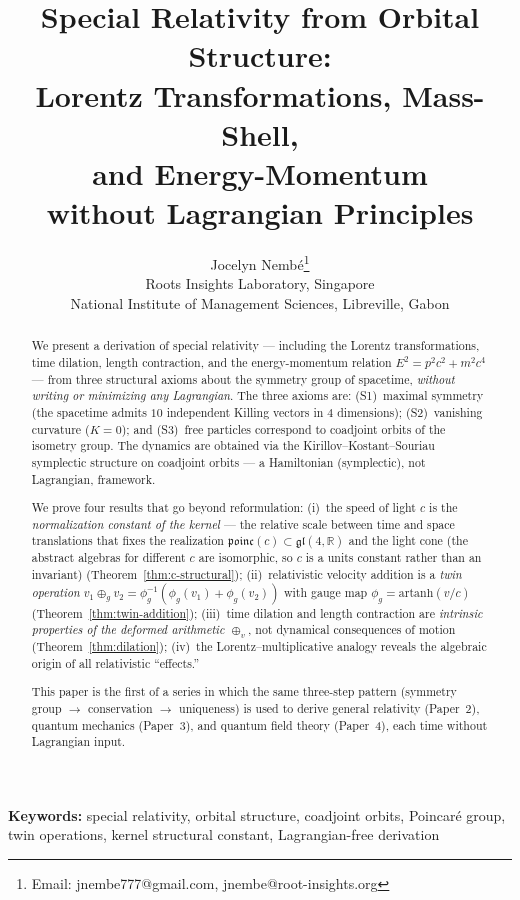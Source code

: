 \documentclass[12pt]{article}
\title{\textbf{Special Relativity from Orbital Structure:\\Lorentz Transformations, Mass-Shell,\\and Energy-Momentum\\without Lagrangian Principles}}
\author{Jocelyn Nemb\'e\thanks{Email: jnembe777@gmail.com, jnembe@root-insights.org}\\[0.3em]
\small Roots Insights Laboratory, Singapore\\
\small National Institute of Management Sciences, Libreville, Gabon}
\date{}
\theoremstyle{plain}
\theoremstyle{definition}
\theoremstyle{remark}
\newcommand{\R}{\mathbb{R}}
\begin{document}
\maketitle

\begin{abstract}
We present a derivation of special relativity --- including the Lorentz transformations, time dilation, length contraction, and the energy-momentum relation $E^2 = p^2c^2 + m^2c^4$ --- from three structural axioms about the symmetry group of spacetime, \emph{without writing or minimizing any Lagrangian}. The three axioms are: (S1)~maximal symmetry (the spacetime admits $10$ independent Killing vectors in $4$ dimensions); (S2)~vanishing curvature ($K=0$); and (S3)~free particles correspond to coadjoint orbits of the isometry group. The dynamics are obtained via the Kirillov--Kostant--Souriau symplectic structure on coadjoint orbits --- a Hamiltonian (symplectic), not Lagrangian, framework.

We prove four results that go beyond reformulation: (i)~the speed of light $c$ is the \emph{normalization constant of the kernel} --- the relative scale between time and space translations that fixes the realization $\mathfrak{poinc}(c) \subset \mathfrak{gl}(4,\R)$ and the light cone (the abstract algebras for different $c$ are isomorphic, so $c$ is a units constant rather than an invariant) (Theorem~\ref{thm:c-structural}); (ii)~relativistic velocity addition is a \emph{twin operation} $v_1 \oplus_g v_2 = \phi_g^{-1}(\phi_g(v_1) + \phi_g(v_2))$ with gauge map $\phi_g = \mathrm{artanh}(v/c)$ (Theorem~\ref{thm:twin-addition}); (iii)~time dilation and length contraction are \emph{intrinsic properties of the deformed arithmetic $\oplus_v$}, not dynamical consequences of motion (Theorem~\ref{thm:dilation}); (iv)~the Lorentz--multiplicative analogy reveals the algebraic origin of all relativistic ``effects.''

This paper is the first of a series in which the same three-step pattern (symmetry group $\to$ conservation $\to$ uniqueness) is used to derive general relativity (Paper~2), quantum mechanics (Paper~3), and quantum field theory (Paper~4), each time without Lagrangian input.
\end{abstract}

\noindent\textbf{Keywords:} special relativity, orbital structure, coadjoint orbits, Poincar\'e group, twin operations, kernel structural constant, Lagrangian-free derivation
\end{document}
